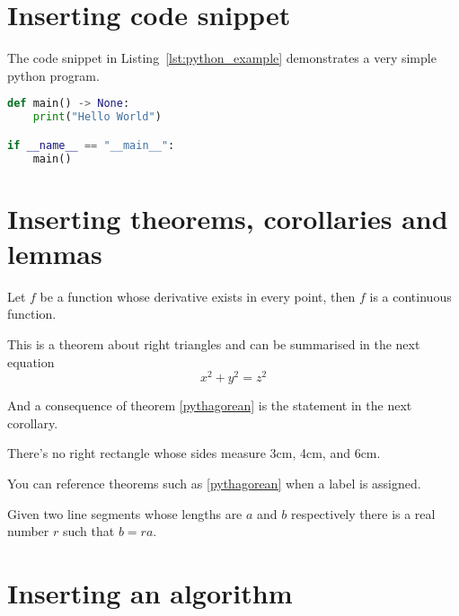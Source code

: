 \section{Inserting code snippet}%
\label{sec:inserting_code_snippet}

The code snippet in Listing~\ref{lst:python_example} demonstrates a very simple
python program.

\begin{lstlisting}[language=Python,caption=Python example,label={lst:python_example}]
def main() -> None:
    print("Hello World")

if __name__ == "__main__":
    main()
\end{lstlisting}

\section{Inserting theorems, corollaries and lemmas}%
\label{sec:inserting_theorems,_corollaries_and_lemmas}

\begin{theorem}
    Let \(f\) be a function whose derivative exists in every point, then \(f\) is
    a continuous function.
\end{theorem}

\begin{theorem}
    \label{pythagorean}
    This is a theorem about right triangles and can be summarised in the next
    equation
    \[ x^2 + y^2 = z^2 \]
\end{theorem}

And a consequence of theorem \ref{pythagorean} is the statement in the next
corollary.

\begin{corollary}
    There's no right rectangle whose sides measure 3cm, 4cm, and 6cm.
\end{corollary}

You can reference theorems such as \ref{pythagorean} when a label is assigned.

\begin{lemma}
    Given two line segments whose lengths are \(a\) and \(b\) respectively there is a
    real number \(r\) such that \(b=ra\).
\end{lemma}

\section{Inserting an algorithm}%
\label{sec:inserting_an_algorithm}

